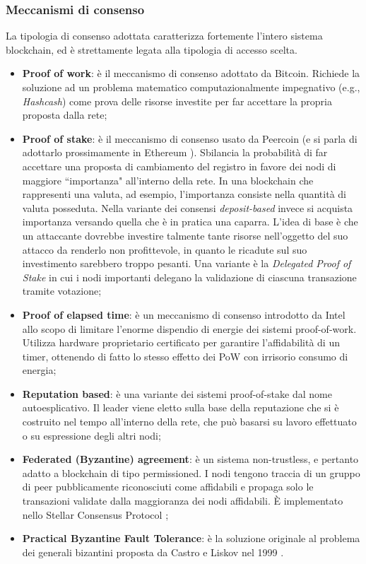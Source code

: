 		\subsubsection{Meccanismi di consenso}
			La tipologia di consenso adottata caratterizza fortemente l'intero sistema blockchain, ed è strettamente legata alla tipologia di accesso scelta.
			\begin{itemize}
				\item \textbf{Proof of work}: è il meccanismo di consenso adottato da Bitcoin. Richiede la soluzione ad un problema matematico computazionalmente impegnativo (e.g., \emph{Hashcash}) come prova delle risorse investite per far accettare la propria proposta dalla rete;
				\item \textbf{Proof of stake}: è il meccanismo di consenso usato da Peercoin (e si parla di adottarlo prossimamente in Ethereum \cite{casper}). Sbilancia la probabilità di far accettare una proposta di cambiamento del registro in favore dei nodi di maggiore ``importanza" all'interno della rete. In una blockchain che rappresenti una valuta, ad esempio, l'importanza consiste nella quantità di valuta posseduta. Nella variante dei consensi \emph{deposit-based} invece si acquista importanza versando quella che è in pratica una caparra. L'idea di base è che un attaccante dovrebbe investire talmente tante risorse nell'oggetto del suo attacco da renderlo non profittevole, in quanto le ricadute sul suo investimento sarebbero troppo pesanti. Una variante è la \emph{Delegated Proof of Stake} in cui i nodi importanti delegano la validazione di ciascuna transazione tramite votazione;
				\item \textbf{Proof of elapsed time}: è un meccanismo di consenso introdotto da Intel \cite{poet} allo scopo di limitare l'enorme dispendio di energie dei sistemi proof-of-work. Utilizza hardware proprietario certificato per garantire l'affidabilità di un timer, ottenendo di fatto lo stesso effetto dei PoW con irrisorio consumo di energia;
				\item \textbf{Reputation based}: è una variante dei sistemi proof-of-stake dal nome autoesplicativo. Il leader viene eletto sulla base della reputazione che si è costruito nel tempo all'interno della rete, che può basarsi su lavoro effettuato o su espressione degli altri nodi;
				\item \textbf{Federated (Byzantine) agreement}: è un sistema non-trustless, e pertanto adatto a blockchain di tipo permissioned. I nodi tengono traccia di un gruppo di peer pubblicamente riconosciuti come affidabili e propaga solo le transazioni validate dalla maggioranza dei nodi affidabili. È implementato nello Stellar Consensus Protocol \cite{stellar_protocol}; 
				\item \textbf{Practical Byzantine Fault Tolerance}: è la soluzione originale al problema dei generali bizantini proposta da Castro e Liskov nel 1999 \cite{PBFT}.
			\end{itemize}

